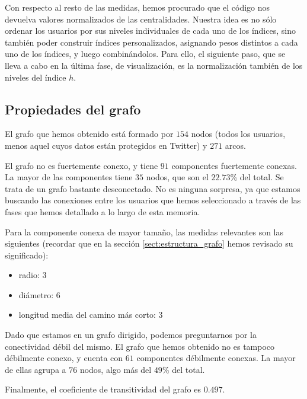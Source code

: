 Con respecto al resto de las medidas, hemos procurado que el código nos
devuelva valores normalizados de las centralidades. Nuestra idea es no sólo ordenar
los usuarios por sus niveles individuales de cada uno de los índices, sino también
poder construir índices personalizados, asignando pesos distintos a cada uno de los 
índices, y luego combinándolos. Para ello, el siguiente paso, que se lleva a cabo en
la última fase, de visualización, es la normalización también de los niveles 
del índice $h$.

\subsection{Propiedades del grafo}
El grafo que hemos obtenido está formado por $154$ nodos (todos los usuarios, menos
aquel cuyos datos están protegidos en Twitter) y $271$ arcos.

El grafo no es fuertemente conexo, y tiene $91$ componentes fuertemente conexas.
La mayor de las componentes tiene $35$ nodos, que son el $22.73$\% del total.
Se trata de un grafo bastante desconectado. No es ninguna sorpresa, ya que 
estamos buscando las conexiones entre los usuarios que hemos seleccionado 
a través de las fases que hemos detallado a lo largo de esta memoria.

Para la componente conexa de mayor tamaño, las medidas 
relevantes son las siguientes (recordar que en la sección \ref{sect:estructura_grafo} hemos
revisado su significado):   
\begin{itemize}
\item radio: $3$
\item diámetro: $6$
\item longitud media del camino más corto: $3$
\end{itemize}
Dado que estamos en un grafo dirigido, podemos preguntarnos por la conectividad débil
del mismo. El grafo que hemos obtenido no es tampoco débilmente conexo, y cuenta
con $61$ componentes débilmente conexas. La mayor de ellas agrupa a $76$ nodos, algo más del
$49$\% del total.

Finalmente, el coeficiente de transitividad del grafo es $0.497$.


